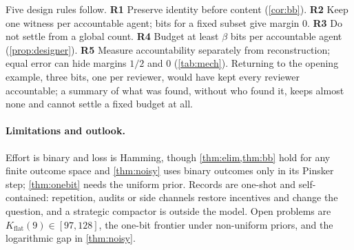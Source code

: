 \documentclass[sigconf,anonymous,acmthm=false]{acmart}
\theoremstyle{acmplain}
\theoremstyle{acmdefinition}
\newcommand{\Kflat}{K_{\mathrm{flat}}}
\begin{document}
Five design rules follow. \textbf{R1} Preserve identity before content (\cref{cor:bb}).
\textbf{R2} Keep one witness per accountable agent; bits for a fixed subset give margin 0.
\textbf{R3} Do not settle from a global count. \textbf{R4} Budget at least $\beta$ bits per
accountable agent (\cref{prop:designer}). \textbf{R5} Measure accountability separately from
reconstruction; equal error can hide margins $1/2$ and 0 (\cref{tab:mech}). Returning to the
opening example, three bits, one per reviewer, would have kept every reviewer accountable;
a summary of what was found, without who found it, keeps almost none and cannot settle a fixed budget at all.

\paragraph{Limitations and outlook.} Effort is binary and loss is Hamming, though
\cref{thm:elim,thm:bb} hold for any finite outcome space and \cref{thm:noisy} uses binary
outcomes only in its Pinsker step; \cref{thm:onebit} needs the uniform prior. Records are
one-shot and self-contained: repetition, audits or side channels restore incentives and
change the question, and a strategic compactor is outside the model. Open problems are
$\Kflat(9)\in[97,128]$, the one-bit frontier under non-uniform priors, and the logarithmic gap
in \cref{thm:noisy}.

\label{endbody}

\end{document}
